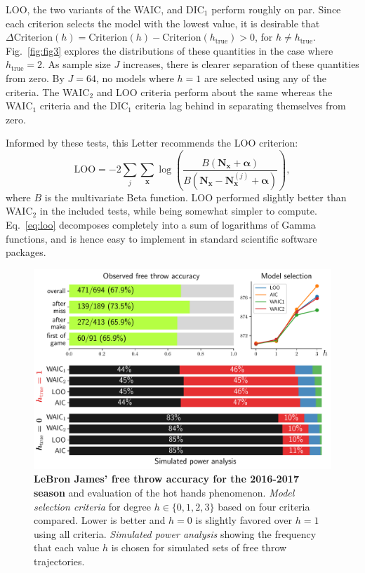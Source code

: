 \documentclass{IOS-Book-Article}
\newcommand{\bN}{\mathbf{N}}
\newcommand{\bx}{\mathbf{x}}
\newcommand{\balpha}{{\boldsymbol\alpha}}
\begin{document}
LOO, the two variants of the WAIC,  and DIC$_1$ perform roughly on par. Since each criterion selects the model with the lowest value, it is desirable that $\Delta\textrm{Criterion}(h)=\textrm{Criterion}(h)-\textrm{Criterion}(h_{\textrm{true}})>0$, for $h\neq h_{\textrm{true}}$. Fig.~\ref{fig:fig3} explores the distributions of these quantities in the case where $h_{\textrm{true}}=2$.  As sample size $J$ increases, there is clearer separation of these quantities from zero. By $J=64$, no models where $h=1$ are selected using any of the criteria. The WAIC$_2$ and LOO criteria perform about the same whereas the WAIC$_1$ criteria and the DIC$_1$ criteria lag behind in separating themselves from zero.


Informed by these tests, this Letter recommends the LOO criterion:
\begin{equation}
\textrm{LOO} = -2\sum_j \sum_{\bx}  \log\left(  \frac{B(\bN_\bx  +\balpha)}{B(\bN_\bx -\bN_{\bx}^{(j)} +\balpha)} \right),
\label{eq:loo}
\end{equation}
where $B$ is the multivariate Beta function. LOO performed slightly better than WAIC$_2$ in the included tests, while being somewhat simpler to compute. Eq.~\ref{eq:loo} decomposes completely into a sum of logarithms of Gamma functions, and is hence easy to implement in standard scientific software packages.

\begin{figure}
\includegraphics[width=\linewidth]{fig4}
\caption{\textbf{LeBron James' free throw accuracy for the 2016-2017 season} and evaluation of the hot hands phenomenon. \emph{Model selection criteria} for degree $h\in\{0,1,2,3\}$ based on four criteria compared. Lower is better and $h=0$ is slightly favored over $h=1$ using all criteria. \emph{Simulated power analysis} showing the frequency that each value $h$ is chosen for simulated sets of free throw trajectories. }
\label{fig:freethrows}
\end{figure}
\end{document}
